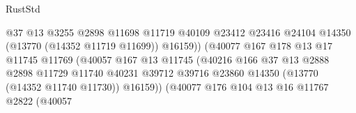 \begin{lexlean}{RustStd}
\begin{coremodule}
                                                @37
                                                @13
                                                @3255
                                                @2898
                                                @11698
                                                @11719
                                                @40109
                                                @23412
                                                @23416
                                                @24104
                                                @14350
                                                (@13770 (@14352 @11719 @11699))
                                                @16159))
                                            (@40077
                                              @167
                                              @178
                                              @13
                                              @17
                                              @11745
                                              @11769
                                              (@40057
                                                @167
                                                @13
                                                @11745
                                                (@40216
                                                  @166
                                                  @37
                                                  @13
                                                  @2888
                                                  @2898
                                                  @11729
                                                  @11740
                                                  @40231
                                                  @39712
                                                  @39716
                                                  @23860
                                                  @14350
                                                  (@13770 (@14352 @11740 @11730))
                                                  @16159))
                                              (@40077
                                                @176
                                                @104
                                                @13
                                                @16
                                                @11767
                                                @2822
                                                (@40057

\end{coremodule}
\end{lexlean}
